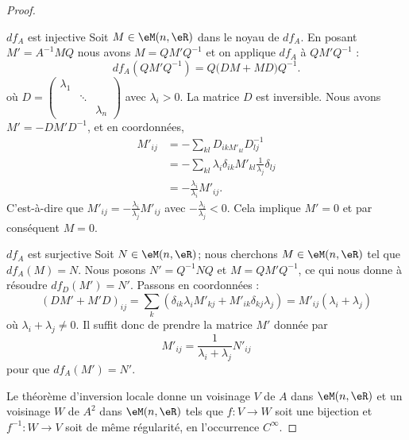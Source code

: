 \begin{proof}
    \begin{subproof}
        \item[\( df_A\) est injective]
            Soit \( M\in \eM(n,\eR)\) dans le noyau de \( df_A\). En posant \( M'=A^{-1}MQ\) nous avons \( M=QM'Q^{-1}\) et on applique \( df_A\) à \( QM'Q^{-1}\) :
            \begin{equation}
                df_A(QM'Q^{-1})=Q\big( DM+MD \big)Q^{-1}.
            \end{equation}
            où \( D=\begin{pmatrix}
                \lambda_1   &           &       \\
                            &   \ddots  &       \\
                            &           &   \lambda_n
            \end{pmatrix}\) avec \( \lambda_i>0\). La matrice \( D\) est inversible. Nous avons \( M'=-DM'D^{-1}\), et en coordonnées,
            \begin{subequations}
                \begin{align}
                    M'_{ij} & = -\sum_{kl}D_{ikM'_{kl}}D^{-1}_{lj}                                      \\
                            & = -\sum_{kl}\lambda_i\delta_{ik}M'_{kl}\frac{1}{ \lambda_j }\delta_{lj}   \\
                            & = -\frac{ \lambda_i }{ \lambda_i }M'_{ij}.
                \end{align}
            \end{subequations}
            C'est-à-dire que \( M'_{ij}=-\frac{ \lambda_i }{ \lambda_j }M'_{ij}\) avec \( -\frac{ \lambda_i }{ \lambda_j }<0\). Cela implique \( M'=0\) et par conséquent \( M=0\).
        \item[\( df_A\) est surjective]
            Soit \( N\in \eM(n,\eR)\); nous cherchons \( M\in \eM(n,\eR)\) tel que \( df_A(M)=N\). Nous posons \( N'=Q^{-1} NQ\) et \( M=QM'Q^{-1}\), ce qui nous donne à résoudre \( df_D(M')=N'\). Passons en coordonnées :
            \begin{equation}
                (DM'+M'D)_{ij}=\sum_k(\delta_{ik}\lambda_iM'_{kj}+M'_{ik}\delta_{kj}\lambda_j)=M'_{ij}(\lambda_i+\lambda_j)
            \end{equation}
            où \( \lambda_i+\lambda_j\neq 0\). Il suffit donc de prendre la matrice \( M'\) donnée par
            \begin{equation}
                M'_{ij}=\frac{1}{ \lambda_i+\lambda_j }N'_{ij}
            \end{equation}
            pour que \( df_A(M')=N'\).
    \end{subproof}

    Le théorème d'inversion locale donne un voisinage \( V\) de \( A\) dans \( \eM(n,\eR)\) et un voisinage \( W\) de \( A^2\) dans \( \eM(n,\eR)\) tels que \( f\colon V\to W\) soit une bijection  et \( f^{-1}\colon W\to V\) soit de même régularité, en l'occurrence \( C^{\infty}\).
\end{proof}

